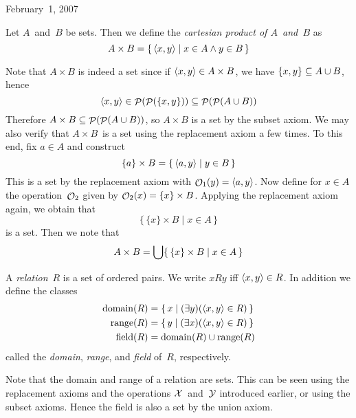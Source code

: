 \begin{lecture}{February~1, 2007}
\begin{defn}
Let \(A\)~and~\(B\) be sets. Then we define the \emph{cartesian product of \(A\)~and~\(B\)} as
\[A\times B=\{\,\langle{x},{y}\rangle\mid x\in A\land y\in B\,\}\]
\end{defn}
\noindent Note that \(A\times B\) is indeed a set since if \(\langle{x},{y}\rangle\in A\times B\), we have \(\{x,y\}\subseteq A\cup B\), hence
\[\langle{x},{y}\rangle\in\mathop{\mathcal{P}}(\mathop{\mathcal{P}}(\{x,y\}))\subseteq\mathop{\mathcal{P}}(\mathop{\mathcal{P}}(A\cup B))\]
Therefore \(A\times B\subseteq\mathop{\mathcal{P}}(\mathop{\mathcal{P}}(A\cup B))\), so \(A\times B\) is a set by the subset axiom. We may also verify that \(A\times B\)~is a set using the replacement axiom a few times. To this end, fix \(a\in A\) and construct
\[\{a\}\times B=\{\,\langle{a},{y}\rangle\mid y\in B\,\}\]
This is a set by the replacement axiom with \(\mathop{\mathcal{O}}\nolimits_1(y)=\langle{a},{y}\rangle\). Now define for \(x\in A\) the operation~\(\mathop{\mathcal{O}}\nolimits_2\) given by \(\mathop{\mathcal{O}}\nolimits_2(x)=\{x\}\times B\). Applying the replacement axiom again, we obtain that
\[\{\,\{x\}\times B\mid x\in A\,\}\]
is a set. Then we note that
\[A\times B=\bigcup\{\,\{x\}\times B\mid x\in A\,\}\]

\begin{defn}
A \emph{relation}~\(R\) is a set of ordered pairs. We write \(xRy\) iff \(\langle{x},{y}\rangle\in R\). In addition we define the classes
\begin{align*}
\operatorname{domain}(R)&=\{\,x\mid(\exists y)(\langle{x},{y}\rangle\in R)\,\}\\
\operatorname{range}(R)&=\{\,y\mid(\exists x)(\langle{x},{y}\rangle\in R)\,\}\\
\operatorname{field}(R)&=\operatorname{domain}(R)\cup\operatorname{range}(R)
\end{align*}
called the \emph{domain}, \emph{range}, and \emph{field} of~\(R\), respectively.
\end{defn}
\noindent Note that the domain and range of a relation are sets. This can be seen using the replacement axioms and the operations \(\mathcal{X}\)~and~\(\mathcal{Y}\) introduced earlier, or using the subset axioms. Hence the field is also a set by the union axiom.


\end{lecture}
